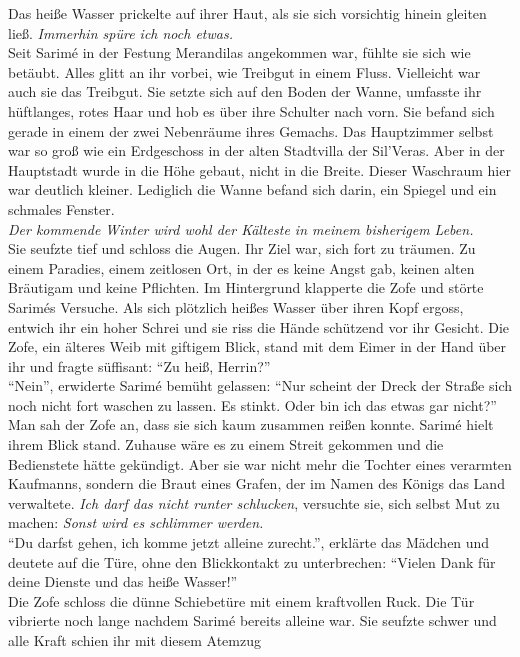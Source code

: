 Das heiße Wasser prickelte auf ihrer Haut, als sie sich vorsichtig hinein gleiten ließ. 
\textit{Immerhin spüre ich noch etwas.}\\
Seit Sarimé in der Festung Merandilas angekommen war, fühlte sie sich wie betäubt. Alles glitt an 
ihr vorbei, wie Treibgut in einem Fluss. Vielleicht war auch sie das Treibgut. Sie setzte sich auf 
den Boden der Wanne, umfasste ihr hüftlanges, rotes Haar und hob es über ihre Schulter nach vorn. 
Sie befand sich gerade in einem der zwei Nebenräume ihres Gemachs. Das Hauptzimmer selbst war so 
groß wie ein Erdgeschoss in der alten Stadtvilla der Sil'Veras. Aber in der Hauptstadt wurde in die 
Höhe gebaut, nicht in die Breite. Dieser Waschraum hier war deutlich kleiner. Lediglich die Wanne 
befand sich darin, ein Spiegel und ein schmales Fenster.\\
\textit{Der kommende Winter wird wohl der Kälteste in meinem bisherigem Leben.}\\
Sie seufzte tief und schloss die Augen. Ihr Ziel war, sich fort zu träumen. Zu einem Paradies, einem 
zeitlosen Ort, in der es keine Angst gab, keinen alten Bräutigam und keine Pflichten. Im Hintergrund 
klapperte die Zofe und störte Sarimés Versuche. Als sich plötzlich heißes Wasser über ihren Kopf 
ergoss, entwich ihr ein hoher Schrei und sie riss die Hände schützend vor ihr Gesicht. Die Zofe, ein 
älteres Weib mit giftigem Blick, stand mit dem Eimer in der Hand über ihr und fragte 
süffisant: ``Zu heiß, Herrin?''\\
``Nein'', erwiderte Sarimé bemüht gelassen: ``Nur scheint der Dreck der Straße sich noch nicht fort 
waschen zu lassen. Es stinkt. Oder bin ich das etwas gar nicht?''\\
Man sah der Zofe an, dass sie sich kaum zusammen reißen konnte. Sarimé hielt ihrem Blick stand. 
Zuhause wäre es zu einem Streit gekommen und die Bedienstete hätte gekündigt. Aber sie war nicht 
mehr die Tochter eines verarmten Kaufmanns, sondern die Braut eines Grafen, der im Namen des Königs 
das Land verwaltete. \textit{Ich darf das nicht runter schlucken}, versuchte sie, sich selbst Mut zu 
machen: \textit{Sonst wird es schlimmer werden.}\\
``Du darfst gehen, ich komme jetzt alleine zurecht.'', erklärte das Mädchen und deutete auf die 
Türe, ohne den Blickkontakt zu unterbrechen: ``Vielen Dank für deine Dienste und das heiße 
Wasser!''\\
Die Zofe schloss die dünne Schiebetüre mit einem kraftvollen Ruck. Die Tür vibrierte noch lange 
nachdem Sarimé bereits alleine war. Sie seufzte schwer und alle Kraft schien ihr mit diesem Atemzug 
